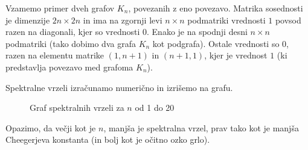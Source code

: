 \begin{primer}
    Vzamemo primer dveh grafov \(K_n\), povezanih z eno povezavo. Matrika sosednosti je dimenzije \(2n \times 2n\) in ima na zgornji levi \(n\times n\) podmatriki vrednosti \(1\) povsod razen na diagonali, kjer so vrednosti \(0\). Enako je na spodnji desni \(n\times n\) podmatriki (tako dobimo dva grafa \(K_n\) kot podgrafa). Ostale vrednosti so \(0\), razen na elementu matrike \((1, n+1)\) in \((n+1, 1)\), kjer je vrednost \(1\) (ki predstavlja povezavo med grafoma \(K_n\)).

    Spektralne vrzeli izračunamo numerično in izrišemo na grafu.
    \begin{figure}[h!]
        \centering
        \caption{Graf spektralnih vrzeli za \(n\) od 1 do 20}
    \end{figure}
    Opazimo, da večji kot je \(n\), manjša je spektralna vrzel, prav tako kot je manjša Cheegerjeva konstanta (in bolj kot je očitno ozko grlo).
\end{primer}


